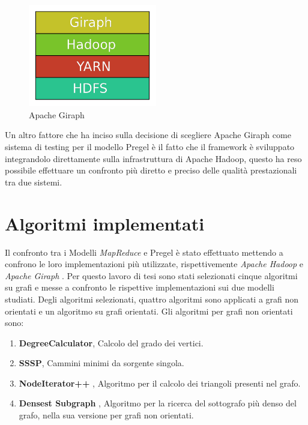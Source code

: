 \documentclass[LaM,binding=0.6cm]{sapthesis}
\begin{document}
\begin{figure}
\centering
\includegraphics[width=0.5\textwidth]{layer_giraph}
\caption{Apache Giraph}
\label{fig:giraph}
\end{figure}

Un altro fattore  che ha inciso sulla decisione di scegliere Apache Giraph come sistema di testing per il modello Pregel è il fatto che il framework è sviluppato integrandolo direttamente sulla infrastruttura di Apache Hadoop, questo ha reso possibile effettuare un confronto più diretto e preciso delle qualità prestazionali tra due sistemi.

\chapter{Algoritmi implementati}

Il confronto tra i Modelli \textit{MapReduce} \cite{Dean:2008:MSD:1327452.1327492} e Pregel \cite{Malewicz:2010:PSL:1807167.1807184} è stato effettuato mettendo a confrono le loro implementazioni più utilizzate, rispettivemente \textit{Apache Hadoop} \cite{1_hadoop.apache.org_2015}e \textit{Apache Giraph} \cite{4_giraph.apache.org_2015}.
Per questo lavoro di tesi sono stati selezionati cinque algoritmi su grafi e messe a confronto le rispettive implementazioni sui due modelli studiati. Degli algoritmi selezionati, quattro algoritmi sono applicati a grafi non orientati e un algoritmo su grafi orientati. Gli algoritmi per grafi non orientati sono:
\begin{enumerate}
\item \textbf{DegreeCalculator}, Calcolo del grado dei vertici.
\item \textbf{SSSP}, Cammini minimi da sorgente singola.
\item \textbf{NodeIterator++} \cite{Suri:2011:CTC:1963405.1963491} , Algoritmo per il calcolo dei triangoli presenti nel grafo.
\item \textbf{Densest Subgraph} \cite{DBLP:journals/corr/abs-1201-6567}, Algoritmo per la ricerca del sottografo più denso del grafo, nella sua versione per grafi non orientati.
\end{enumerate}
\end{document}
